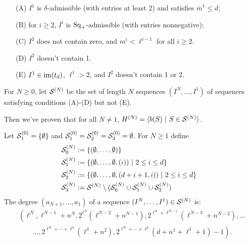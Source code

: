 \documentclass[10pt]{article}
\newcommand{\SqShift}{\Sq_{\smash{+}}}
\newcommand{\Sq}{\mathrm{Sq}}
\newcommand{\minDim}{m}
\newcommand{\minDimP}{\overline{m}}
\begin{document}
\begin{AxisComputationSummary}

\begin{shaded}
\begin{enumerate}[A)]
\squishlist
\setlength{\parindent}{.25in}
\item[\textup{(A)}] $I^1$ is $\delta$-admissible (with entries at least 2) and satisfies $\minDimP^1\leq d$;
\item[\textup{(B)}] for $i\geq2$, $I^i$ is $\SqShift$-admissible (with entries nonnegative);
\item[\textup{(C)}] $I^2$ does not contain zero, and $\minDim^i<\ell^{i-1}$ for all $i\geq2$.
\item[(D)] $I^2$ doesn't contain 1.
\item[(E)] $I^1\in\operatorname{im}(t_d)$, $\ell^1>2$, and $I^2$ doesn't contain 1 or 2.
\end{enumerate}
For $N\geq0$, let $\mathcal{S}^{(N)}$ be the set of length $N$ sequences $(I^{N},\ldots,I^1)$ of sequences satisfying conditions \textup{(A)}-\textup{(D)} but not \textup{(E)}.

Then we've proven that for all $N\neq1$, $H^{(N)}=\langle b(S)\ |\ S\in\mathcal{S}^{(N)}\rangle$.

Let $\mathcal{S}^{(0)}_1=\{\emptyset\}$ and $\mathcal{S}^{(0)}_1=\mathcal{S}^{(0)}_2=\mathcal{S}^{(0)}_3=\emptyset$. For $N\geq1$ define
\begin{alignat*}{2}
\calS^{(N)}_0
&:=
\{(\emptyset,\ldots,\emptyset)\}%
\\
\calS^{(N)}_1
&:=%
\{(\emptyset,\ldots,\emptyset,(i))\ |\ 2\leq i\leq d\}\\
\calS^{(N)}_2&:=
\{(\emptyset,\ldots,\emptyset,(d+i+1,i))\ |\ 2\leq i\leq d\}\\
\calS^{(N)}_3&:=\calS^{(N)}\setminus(\calS^{(N)}_0 \cup\calS^{(N)}_1\cup \calS^{(N)}_2)
\end{alignat*}
The degree $ (a_{N+1},\ldots,a_1) $ of a sequence $(I^N,\ldots,I^1)\in\mathcal{S}^{(N)}$ is:
\begin{align*}
& \left( \ell^N,\ell^{N-1}+n^N,2^{\ell^N}\!\left(\ell^{N-2}+n^{N-1}\right),2^{\ell^N+\ell^{N-1}}\!\left(\ell^{N-3}+n^{N-2}\right),\ldots \right.\\
 &\qquad \left.{}\ldots,2^{\ell^N+\cdots+\ell^{3}}(\ell^1+n^2),2^{\ell^N+\cdots+\ell^{2}}(d+n^1+\ell^1+1)-1 \right).
\end{align*}



\end{shaded}
\end{AxisComputationSummary}
\end{document}
